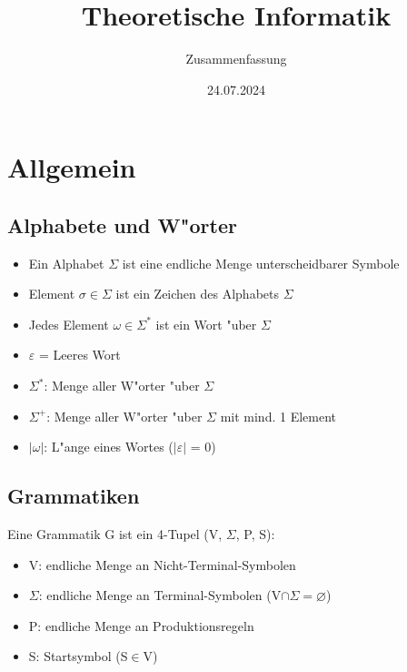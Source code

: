 \documentclass[11pt, a4paper]{scrartcl}
\title{Theoretische Informatik}
\author{Zusammenfassung}
\date{24.07.2024}
\begin{document}
\maketitle

\tableofcontents
\newpage



\section{Allgemein}

\vspace{0.5em}

\subsection{Alphabete und W"orter}

\begin{itemize}
    \item Ein Alphabet $\Sigma$ ist eine endliche Menge unterscheidbarer Symbole
    \item Element $\sigma \in \Sigma$ ist ein Zeichen des Alphabets $\Sigma$
    \item Jedes Element $\omega \in \Sigma^*$  ist ein Wort "uber $\Sigma$
    \item $\varepsilon$ = Leeres Wort
    \item $\Sigma^*$: Menge aller W"orter "uber $\Sigma$
    \item $\Sigma^+$: Menge aller W"orter "uber $\Sigma$ mit mind. 1 Element
    \item $|\omega|$: L"ange eines Wortes ($|\varepsilon|$ = 0)
\end{itemize}

\vspace{1em}

\subsection{Grammatiken}

Eine Grammatik G ist ein 4-Tupel (V, $\Sigma$, P, S):
\begin{itemize}
    \item V: endliche Menge an Nicht-Terminal-Symbolen
    \item $\Sigma$: endliche Menge an Terminal-Symbolen (V$\cap\Sigma=\varnothing$)
    \item P: endliche Menge an Produktionsregeln
    \item S: Startsymbol (S$\in$V)
\end{itemize}
\end{document}
